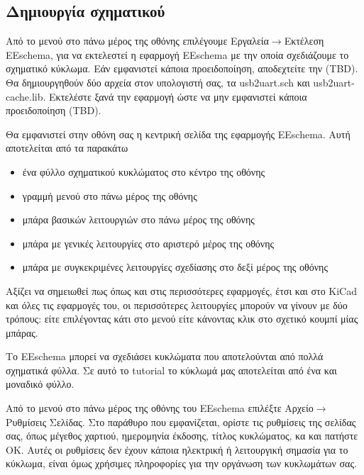 \documentclass[a4paper]{article}
\begin{document}
\subsection{Δημιουργία σχηματικού}
Από το μενού στο πάνω μέρος της οθόνης επιλέγουμε Εργαλεία$\rightarrow$Εκτέλεση EEschema, για να εκτελεστεί η εφαρμογή EEschema με την οποία σχεδιάζουμε το σχηματικό κύκλωμα. Εάν εμφανιστεί κάποια προειδοποίηση, αποδεχτείτε την (TBD). Θα δημιουργηθούν δύο αρχεία στον υπολογιστή σας, τα usb2uart.sch και usb2uart-cache.lib. Εκτελέστε ξανά την εφαρμογή ώστε να μην εμφανιστεί κάποια προειδοποίηση (TBD).

Θα εμφανιστεί στην οθόνη σας η κεντρική σελίδα της εφαρμογής EEschema. Αυτή αποτελείται από τα παρακάτω
\begin{itemize}
    \item ένα φύλλο σχηματικού κυκλώματος στο κέντρο της οθόνης
    \item γραμμή μενού στο πάνω μέρος της οθόνης
    \item μπάρα βασικών λειτουργιών στο πάνω μέρος της οθόνης
    \item μπάρα με γενικές λειτουργίες στο αριστερό μέρος της οθόνης
    \item μπάρα με συγκεκριμένες λειτουργίες σχεδίασης στο δεξί μέρος της οθόνης
\end{itemize}
Αξίζει να σημειωθεί πως όπως και στις περισσότερες εφαρμογές, έτσι και στο KiCad και όλες τις εφαρμογές του, οι περισσότερες λειτουργίες μπορούν να γίνουν με δύο τρόπους: είτε επιλέγοντας κάτι στο μενού είτε κάνοντας κλικ στο σχετικό κουμπί μίας μπάρας.

\begin{figure}
  \begin{center}
    \label{fig:kicad-main}
  \end{center}
\end{figure}

Το EEschema μπορεί να σχεδιάσει κυκλώματα που αποτελούνται από πολλά σχηματικά φύλλα. Σε αυτό το tutorial το κύκλωμά μας αποτελείται από ένα και μοναδικό φύλλο.

Από το μενού στο πάνω μέρος της οθόνης του EEschema επιλέξτε Αρχείο$\rightarrow$Ρυθμίσεις Σελίδας. Στο παράθυρο που εμφανίζεται, ορίστε τις ρυθμίσεις της σελίδας σας, όπως μέγεθος χαρτιού, ημερομηνία έκδοσης, τίτλος κυκλώματος, κα και πατήστε ΟΚ. Αυτές οι ρυθμίσεις δεν έχουν κάποια ηλεκτρική ή λειτουργική σημασία για το κύκλωμα, είναι όμως χρήσιμες πληροφορίες για την οργάνωση των κυκλωμάτων σας.
\end{document}
